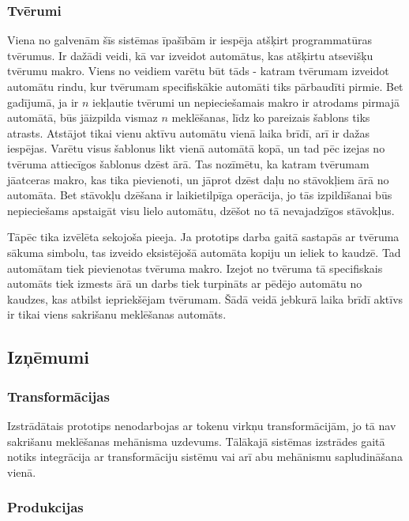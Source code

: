 \subsubsection{Tvērumi}

Viena no galvenām šīs sistēmas īpašībām ir iespēja atšķirt programmatūras tvērumus. Ir dažādi veidi, kā var izveidot automātus, kas atšķirtu atsevišķu tvērumu makro. Viens no veidiem varētu būt tāds - katram tvērumam izveidot automātu rindu, kur tvērumam specifiskākie automāti tiks pārbaudīti pirmie. Bet gadījumā, ja ir $n$ iekļautie tvērumi un nepieciešamais makro ir atrodams pirmajā automātā, būs jāizpilda vismaz $n$ meklēšanas, līdz ko pareizais šablons tiks atrasts. Atstājot tikai vienu aktīvu automātu vienā laika brīdī, arī ir dažas iespējas. Varētu visus šablonus likt vienā automātā kopā, un tad pēc izejas no tvēruma attiecīgos šablonus dzēst ārā. Tas nozīmētu, ka katram tvērumam jāatceras makro, kas tika pievienoti, un jāprot dzēst daļu no stāvokļiem ārā no automāta. Bet stāvokļu dzēšana ir laikietilpīga operācija, jo tās izpildīšanai būs nepieciešams apstaigāt visu lielo automātu, dzēšot no tā nevajadzīgos stāvokļus.

Tāpēc tika izvēlēta sekojoša pieeja. Ja prototips darba gaitā sastapās ar tvēruma sākuma simbolu, tas izveido eksistējošā automāta kopiju un ieliek to kaudzē. Tad automātam tiek pievienotas tvēruma makro. Izejot no tvēruma tā specifiskais automāts tiek izmests ārā un darbs tiek turpināts ar pēdējo automātu no kaudzes, kas atbilst iepriekšējam tvērumam. Šādā veidā jebkurā laika brīdī aktīvs ir tikai viens sakrišanu meklēšanas automāts.

\subsection{\label{sbs:prot_problems}Izņēmumi}

\subsubsection{Transformācijas}

Izstrādātais prototips nenodarbojas ar tokenu virkņu transformācijām, jo tā nav sakrišanu meklēšanas mehānisma uzdevums. Tālākajā sistēmas izstrādes gaitā notiks integrācija ar transformāciju sistēmu vai arī abu mehānismu sapludināšana vienā.

\subsubsection{Produkcijas}

